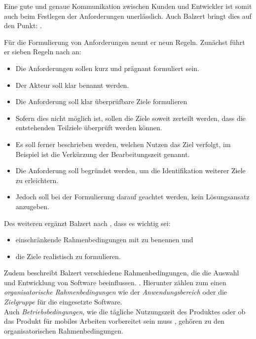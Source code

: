 Eine gute und genaue Kommunikation zwischen Kunden und Entwickler ist somit auch beim Festlegen der Anforderungen unerlässlich. 
Auch Balzert bringt dies auf den Punkt: 
 \citep[][455]{Balzert2010}.

Für die Formulierung von Anforderungen nennt er neun Regeln. Zunächst führt er sieben Regeln nach \cite[][S. 100 ff.]{Pohl2007} an:
\begin{itemize}
\item Die Anforderungen sollen kurz und prägnant formuliert sein. 
\item Der Akteur soll klar benannt werden.
\item Die Anforderung soll klar überprüfbare Ziele formulieren
\item Sofern dies nicht möglich ist, sollen die Ziele soweit zerteilt werden, dass die entstehenden Teilziele überprüft werden können.
\item Es soll ferner beschrieben werden, welchen Nutzen das Ziel verfolgt, im Beispiel ist die Verkürzung der Bearbeitungszeit genannt.
\item Die Anforderung soll begründet werden, um die Identifikation weiterer Ziele zu erleichtern. 
\item Jedoch soll bei der Formulierung darauf geachtet werden, kein Lösungsansatz anzugeben. 
\end{itemize}
Des weiteren ergänzt Balzert nach \cite[][S. 100 f.]{Rupp2007}, dass es wichtig sei:
\begin{itemize}
\item einschränkende Rahmenbedingungen mit zu benennen und
\item die Ziele realistisch zu formulieren. 
\end{itemize}
\citep[für den gesamten Abschnitt vgl.][S. 457 ff.]{Balzert2010}


Zudem beschreibt Balzert verschiedene Rahmenbedingungen, die die Auswahl und Entwicklung von Software beeinflussen. \citep[][459]{Balzert2010}.
Hierunter zählen zum einen \textit{organisatorische Rahmenbedingungen} wie der \textit{Anwendungsbereich} oder die \textit{Zielgruppe} für die eingesetzte Software. \\
Auch \textit{Betriebsbedingungen}, wie die tägliche Nutzungszeit des Produktes oder ob das Produkt \zb für mobiles Arbeiten vorbereitet sein muss \citep[vgl.][S. 459 f.]{Balzert2010}, gehören zu den organisatorischen Rahmenbedingungen.

